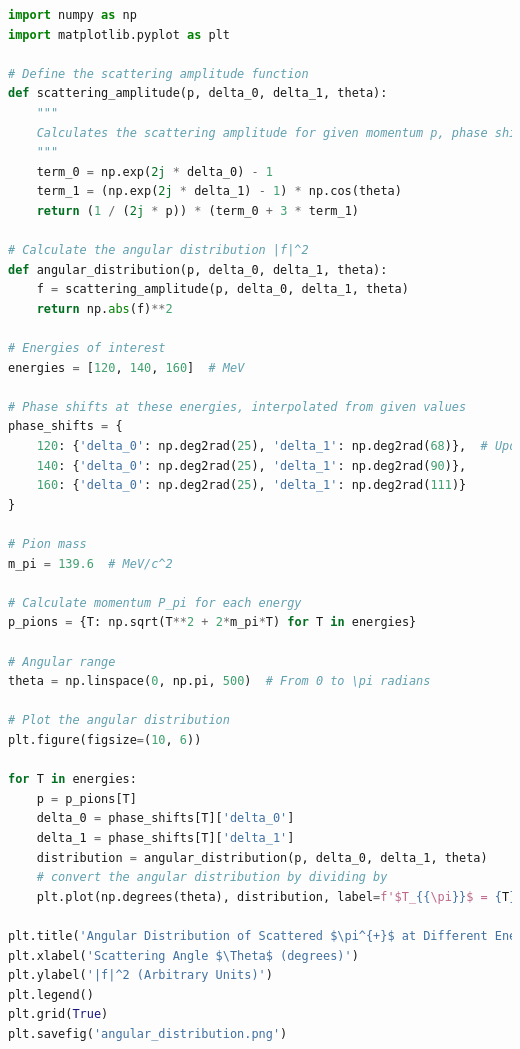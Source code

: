 \documentclass[12pt]{article}
\begin{document}
\begin{lstlisting}[language=Python]
import numpy as np
import matplotlib.pyplot as plt

# Define the scattering amplitude function
def scattering_amplitude(p, delta_0, delta_1, theta):
    """
    Calculates the scattering amplitude for given momentum p, phase shifts delta_0 and delta_1, and angle theta.
    """
    term_0 = np.exp(2j * delta_0) - 1
    term_1 = (np.exp(2j * delta_1) - 1) * np.cos(theta)
    return (1 / (2j * p)) * (term_0 + 3 * term_1)

# Calculate the angular distribution |f|^2
def angular_distribution(p, delta_0, delta_1, theta):
    f = scattering_amplitude(p, delta_0, delta_1, theta)
    return np.abs(f)**2

# Energies of interest
energies = [120, 140, 160]  # MeV

# Phase shifts at these energies, interpolated from given values
phase_shifts = {
    120: {'delta_0': np.deg2rad(25), 'delta_1': np.deg2rad(68)},  # Updated based on the plot provided earlier
    140: {'delta_0': np.deg2rad(25), 'delta_1': np.deg2rad(90)},
    160: {'delta_0': np.deg2rad(25), 'delta_1': np.deg2rad(111)}
}

# Pion mass
m_pi = 139.6  # MeV/c^2

# Calculate momentum P_pi for each energy
p_pions = {T: np.sqrt(T**2 + 2*m_pi*T) for T in energies}

# Angular range
theta = np.linspace(0, np.pi, 500)  # From 0 to \pi radians

# Plot the angular distribution
plt.figure(figsize=(10, 6))

for T in energies:
    p = p_pions[T]
    delta_0 = phase_shifts[T]['delta_0']
    delta_1 = phase_shifts[T]['delta_1']
    distribution = angular_distribution(p, delta_0, delta_1, theta)
    # convert the angular distribution by dividing by 
    plt.plot(np.degrees(theta), distribution, label=f'$T_{{\pi}}$ = {T} MeV')

plt.title('Angular Distribution of Scattered $\pi^{+}$ at Different Energies')
plt.xlabel('Scattering Angle $\Theta$ (degrees)')
plt.ylabel('|f|^2 (Arbitrary Units)')
plt.legend()
plt.grid(True)
plt.savefig('angular_distribution.png')

\end{lstlisting}
\end{document}
